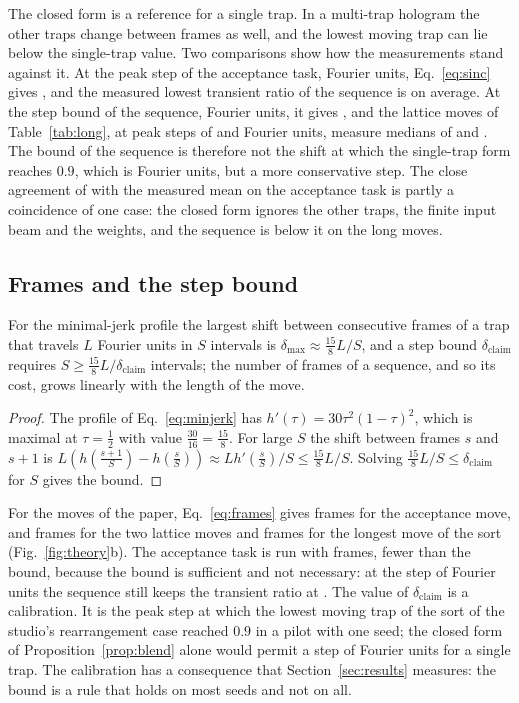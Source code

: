 The closed form is a reference for a single trap. In a multi-trap hologram the other traps change between frames as well, and the lowest moving trap can lie below the single-trap value. Two comparisons show how the measurements stand against it. At the peak step of the acceptance task, \accPeakStep{} Fourier units, Eq.~\ref{eq:sinc} gives \sincAcc{}, and the measured lowest transient ratio of the sequence is \accBTransMean{} on average. At the step bound of the sequence, \claimStepFu{} Fourier units, it gives \sincClaim{}, and the lattice moves of Table~\ref{tab:long}, at peak steps of \longAPeak{} and \longBPeak{} Fourier units, measure medians of \longAMed{} and \longBMed{}. The bound of the sequence is therefore not the shift at which the single-trap form reaches $0.9$, which is \deltaNine{} Fourier units, but a more conservative step. The close agreement of \sincAcc{} with the measured mean on the acceptance task is partly a coincidence of one case: the closed form ignores the other traps, the finite input beam and the weights, and the sequence is below it on the long moves.

\subsection{Frames and the step bound}

\begin{proposition}\label{prop:frames}
For the minimal-jerk profile the largest shift between consecutive frames of a trap that travels $L$ Fourier units in $S$ intervals is $\delta_{\max}\approx\frac{15}{8}L/S$, and a step bound $\delta_{\mathrm{claim}}$ requires $S\ge\frac{15}{8}L/\delta_{\mathrm{claim}}$ intervals; the number of frames of a sequence, and so its cost, grows linearly with the length of the move.
\end{proposition}
\begin{proof}
The profile of Eq.~\ref{eq:minjerk} has $h'(\tau)=30\tau^2(1-\tau)^2$, which is maximal at $\tau=\tfrac12$ with value $\tfrac{30}{16}=\tfrac{15}{8}$. For large $S$ the shift between frames $s$ and $s+1$ is $L(h(\tfrac{s+1}S)-h(\tfrac sS))\approx Lh'(\tfrac sS)/S\le\frac{15}8L/S$. Solving $\frac{15}8L/S\le\delta_{\mathrm{claim}}$ for $S$ gives the bound.
\end{proof}

For the moves of the paper, Eq.~\ref{eq:frames} gives \accFramesForMove{} frames for the acceptance move, \longAFrames{} and \longBFrames{} frames for the two lattice moves and \cTenFrames{} frames for the longest move of the sort (Fig.~\ref{fig:theory}b). The acceptance task is run with \parFrames{} frames, fewer than the bound, because the bound is sufficient and not necessary: at the step of \accPeakStep{} Fourier units the sequence still keeps the transient ratio at \accBTransMean{}. The value of $\delta_{\mathrm{claim}}$ is a calibration. It is the peak step at which the lowest moving trap of the sort of the studio's rearrangement case reached $0.9$ in a pilot with one seed; the closed form of Proposition~\ref{prop:blend} alone would permit a step of \deltaNine{} Fourier units for a single trap. The calibration has a consequence that Section~\ref{sec:results} measures: the bound is a rule that holds on most seeds and not on all.

